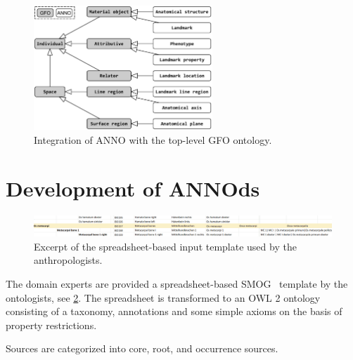 \documentclass[sw]{iosart2x}
\begin{document}
\begin{figure}[h]
\includegraphics[width=0.6\textwidth]{img/gfo.pdf}
\caption{Integration of ANNO with the top-level GFO ontology.}\label{fig:gfo}
\end{figure}

\section{Development of ANNOds}\label{sec:domain}
\begin{figure}[h!t]
\includegraphics[width=\textwidth]{img/smog.png}
\caption{Excerpt of the spreadsheet-based input template used by the anthropologists.}\label{fig:smog}
\end{figure}

The domain experts are provided a spreadsheet-based SMOG~\citep{smog} template by the ontologists, see \cref{fig:smog}.
The spreadsheet is transformed to an OWL 2 ontology consisting of a taxonomy, annotations and some simple axioms on the basis of property restrictions.

Sources are categorized into core, root, and occurrence sources.

\end{document}
